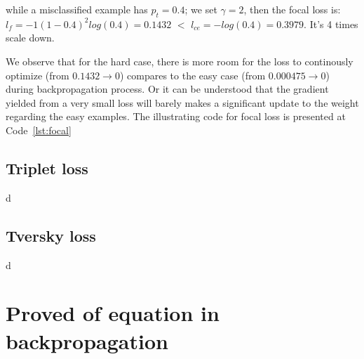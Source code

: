 while a misclassified example has $p_{t}=0.4$; we set $\gamma=2$, then the focal loss is: $l_{f} = -1(1-0.4)^{2}log(0.4)=0.1432$ $<$ $l_{ce} = -log(0.4)=0.3979$. It's 4 times scale down.\newline

We observe that for the hard case, there is more room for the loss to continously optimize (from $0.1432 \rightarrow 0$) compares to the easy case (from $0.000475 \rightarrow 0$) during backpropagation process. Or it can be understood that the gradient yielded from a very small loss will barely makes a significant update to the weight regarding the easy examples. The illustrating code for focal loss is presented at Code~\ref{lst:focal}


\subsection{Triplet loss}
d
\subsection{Tversky loss}
d
\section{Proved of equation in backpropagation}